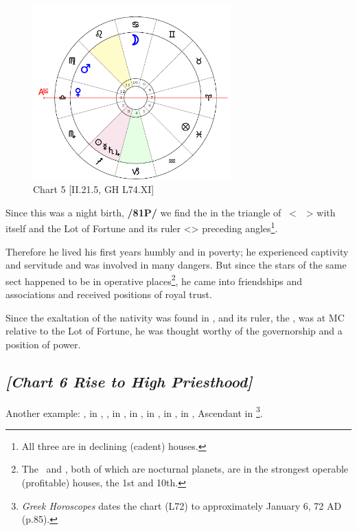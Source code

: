 \clearpage
\begin{figure}
\centering
\includegraphics[width=0.68\textwidth]{charts/2_21_5}
\caption{Chart 5 [II.21.5, GH L74.XI]}
\label{fig:chart05}
\end{figure}

Since this was a night birth, \textbf{/81P/} we find the \Moon\xspace in the triangle of \Mars\, <\Cancer\, \Scorpio\, \Pisces> with \Mars\xspace itself and the Lot of Fortune and its ruler <\Jupiter> preceding angles\footnote{All three are in declining (cadent) houses.}.

Therefore he lived his first years humbly and in poverty; he experienced captivity and servitude and was involved in many dangers. But since the stars of the same sect happened to be in operative places\footnote{The \Moon\, and \Venus, both of which are nocturnal planets, are in the strongest operable (profitable) houses, the 1st and 10th.}, he came into friendships and associations and received positions of royal trust. 

Since the exaltation of the nativity was found in \Leo, and its ruler, the \Sun, was at MC relative to the Lot of Fortune, he was thought worthy of the governorship and a position of power.
\newpage

\subsection*{\textit{[Chart 6 Rise to High Priesthood]}}

Another example: \Sun, \Mercury\xspace in \Capricorn, \Moon, \Venus\xspace in \Sagittarius, \Saturn\xspace in \Scorpio,
\Jupiter\xspace in \Libra, \Mars\xspace in \Aquarius, \Fortune \xspace in \Aries, Ascendant in \Taurus
\footnote{\textit{Greek Horoscopes} dates the chart (L72) to approximately January 6, 72 AD (p.85).}.

